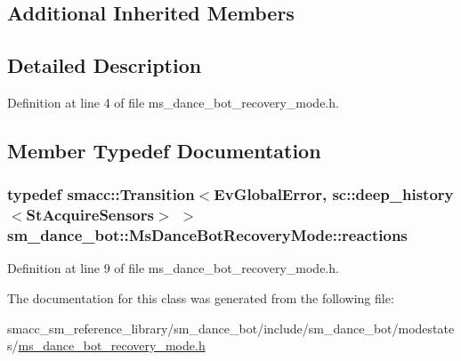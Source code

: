 \subsection*{Additional Inherited Members}


\subsection{Detailed Description}


Definition at line 4 of file ms\+\_\+dance\+\_\+bot\+\_\+recovery\+\_\+mode.\+h.



\subsection{Member Typedef Documentation}
\subsubsection[{\texorpdfstring{reactions}{reactions}}]{\setlength{\rightskip}{0pt plus 5cm}typedef {\bf smacc\+::\+Transition}$<${\bf Ev\+Global\+Error}, sc\+::deep\+\_\+history$<${\bf St\+Acquire\+Sensors}$>$ $>$ {\bf sm\+\_\+dance\+\_\+bot\+::\+Ms\+Dance\+Bot\+Recovery\+Mode\+::reactions}}\hypertarget{classsm__dance__bot_1_1MsDanceBotRecoveryMode_ac97d2ec3eaa9201f352fbe40861f1c02}{}\label{classsm__dance__bot_1_1MsDanceBotRecoveryMode_ac97d2ec3eaa9201f352fbe40861f1c02}


Definition at line 9 of file ms\+\_\+dance\+\_\+bot\+\_\+recovery\+\_\+mode.\+h.



The documentation for this class was generated from the following file\+:\begin{DoxyCompactItemize}
\item 
smacc\+\_\+sm\+\_\+reference\+\_\+library/sm\+\_\+dance\+\_\+bot/include/sm\+\_\+dance\+\_\+bot/modestates/\hyperlink{ms__dance__bot__recovery__mode_8h}{ms\+\_\+dance\+\_\+bot\+\_\+recovery\+\_\+mode.\+h}\end{DoxyCompactItemize}
